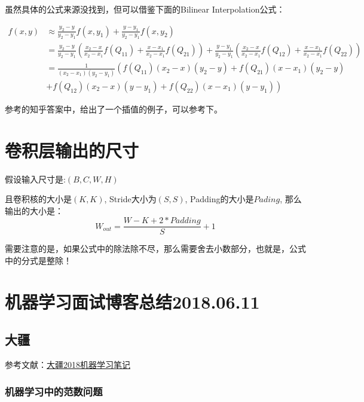 虽然具体的公式来源没找到，但可以借鉴下面的Bilinear Interpolation公式：

\begin{align*}
f(x, y)  & \approx \frac{y_2 - y}{y_2 - y_1} f(x, y_1) + \frac{y-y_1}{y_2 - y_1}f(x, y_2) \\
 & =  \frac{y_2 - y}{y_2 - y_1} \left( \frac{x_2 - x}{x_2 - x_1} f(Q_{11}) + \frac{x - x_1}{x_2 - x_1} f(Q_{21}) \right) + \frac{y - y_1}{y_2 - y_1} \left( \frac{x_2 - x}{x_2 - x_1} f(Q_{12}) + \frac{x - x_1}{x_2 - x_1} f(Q_{22}) \right) \\
 & = \frac{1}{(x_2 - x_1)(y_2 - y_1)} \left( f(Q_{11})(x_2 - x)(y_2 - y) + f(Q_{21})(x - x_1)(y_2 - y) \right.\\
 & + \left. f(Q_{12})(x_2 - x)(y - y_1) + f(Q_{22})(x - x_1)(y - y_1) \right)
\end{align*}

参考的知乎答案中，给出了一个插值的例子，可以参考下。

\section{卷积层输出的尺寸}

假设输入尺寸是:$(B, C, W, H)$

且卷积核的大小是$(K, K)$, Stride大小为$(S, S)$, Padding的大小是$Pading$, 那么输出的大小是：
\begin{displaymath}
W_{out} = \frac{W - K + 2 * Padding}{S} + 1
\end{displaymath}

需要注意的是，如果公式中的除法除不尽，那么需要舍去小数部分，也就是，公式中的分式是整除！

\section{机器学习面试博客总结2018.06.11}

\subsection{大疆}

参考文献：\href{https://blog.csdn.net/weixin_37699515/article/details/80023498}{大疆2018机器学习笔记}

\subsubsection{机器学习中的范数问题}

